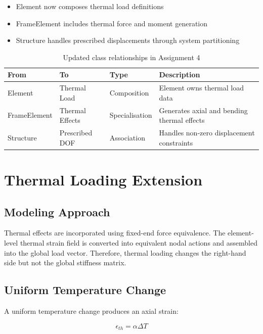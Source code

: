 \begin{itemize}
    \item Element now composes thermal load definitions
    \item FrameElement includes thermal force and moment generation
    \item Structure handles prescribed displacements through system partitioning
\end{itemize}

\begin{table}[H]
\centering
\caption{Updated class relationships in Assignment 4}
\begin{tabular}{llll}
\toprule
From & To & Type & Description \\
\midrule
Element & Thermal Load & Composition & Element owns thermal load data \\
FrameElement & Thermal Effects & Specialisation & Generates axial and bending thermal effects \\
Structure & Prescribed DOF & Association & Handles non-zero displacement constraints \\
\bottomrule
\end{tabular}
\end{table}

\pagebreak
\section{Thermal Loading Extension}

\subsection{Modeling Approach}

Thermal effects are incorporated using fixed-end force equivalence. The element-level thermal strain field is converted into equivalent nodal actions and assembled into the global load vector. Therefore, thermal loading changes the right-hand side but not the global stiffness matrix.

\subsection{Uniform Temperature Change}

A uniform temperature change produces an axial strain:

\begin{equation}
\epsilon_{th} = \alpha \Delta T
\end{equation}

